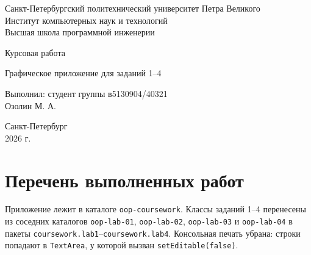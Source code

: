\documentclass[a4paper,14pt]{extarticle}
\begin{document}
\begin{titlepage}
    \centering
    {\large Санкт-Петербургский политехнический университет Петра Великого\\
    Институт компьютерных наук и технологий\\
    Высшая школа программной инженерии\par}
    \vspace{4.5cm}
    {\Large Курсовая работа\par}
    \vspace{0.6cm}
    {\large Графическое приложение для заданий 1--4\par}
    \vspace{4.5cm}
    \begin{flushright}
        Выполнил: студент группы в5130904/40321 \\
        {\hspace{5cm}} Озолин М. А.
    \end{flushright}
    \vfill
    {\large Санкт-Петербург \\ 2026 г.\par}
\end{titlepage}

\section*{Перечень выполненных работ}

Приложение лежит в каталоге \texttt{oop-coursework}. Классы заданий 1--4 перенесены из соседних каталогов \texttt{oop-lab-01}, \texttt{oop-lab-02}, \texttt{oop-lab-03} и \texttt{oop-lab-04} в пакеты \texttt{coursework.lab1}--\texttt{coursework.lab4}. Консольная печать убрана: строки попадают в \texttt{TextArea}, у которой вызван \texttt{setEditable(false)}.
\end{document}

